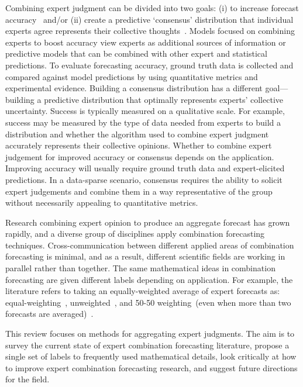 \documentclass[preprint,authoryear,nonatbib]{elsarticle}
\begin{document}
Combining expert judgment can be divided into two goals: (i) to increase forecast accuracy~\parencite{bates1969combination,granger1984improved} and/or (ii) create a predictive `consensus' distribution that individual experts agree represents their collective thoughts~\parencite{stone1961opinion,genest1986combining,cooke1991experts}.
Models focused on combining experts to boost accuracy view experts as additional sources of information or predictive models that can be combined with other expert and statistical predictions.
To evaluate forecasting accuracy, ground truth data is collected and compared against model predictions by using quantitative metrics and experimental evidence.
Building a consensus distribution has a different goal---building a predictive distribution that optimally represents experts' collective uncertainty.
Success is typically measured on a qualitative scale.
For example, success may be measured by the type of data needed from experts to build a distribution and whether the algorithm used to combine expert judgment accurately represents their collective opinions.
Whether to combine expert judgement for improved accuracy or consensus depends on the application.
Improving accuracy will usually require ground truth data and expert-elicited predictions.
In a data-sparse scenario, consensus requires the ability to solicit expert judgements and combine them in a way representative of the group without necessarily appealing to quantitative metrics.

Research combining expert opinion to produce an aggregate forecast has grown rapidly, and a diverse group of disciplines apply combination forecasting techniques.
Cross-communication between different applied areas of combination forecasting is minimal, and as a result, different scientific fields are working in parallel rather than together.
The same mathematical ideas in combination forecasting are given different labels depending on application.
For example, the literature refers to taking an equally-weighted average of expert forecasts as: equal-weighting~\parencite{cooke2014out,hanea2018value,ISI:000327676900001}, unweighted~\parencite{graefe2015accuracy}, and 50-50 weighting~(even when more than two forecasts are averaged)~\parencite{alvarado2017expertise}.

This review focuses on methods for aggregating expert judgments.
The aim is to survey the current state of expert combination forecasting literature, propose a single set of labels to frequently used mathematical details, look critically at how to improve expert combination forecasting research, and suggest future directions for the field. 
\end{document}
